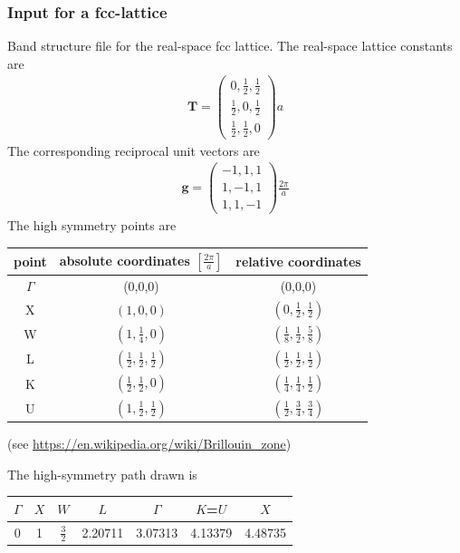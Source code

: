 \documentclass[final,12pt,makeidx,DIV=calc]{article}
\newcommand{\mat}[1]{\mathbf{#1}}
\begin{document}
{{{{{{\subsubsection{Input for a fcc-lattice}
Band structure file for the real-space fcc lattice. The real-space
lattice constants are
\begin{eqnarray}
\mat{T}=\left(\begin{array}{ccc}
0,\frac{1}{2},\frac{1}{2}\\
\frac{1}{2},0,\frac{1}{2}\\
\frac{1}{2},\frac{1}{2},0\end{array}
\right)a
\end{eqnarray}
The corresponding reciprocal unit vectors are
\begin{eqnarray}
\mat{g}=\left(\begin{array}{ccc}
-1,1,1\\
1,-1,1\\
1,1,-1
\end{array}\right)\frac{2\pi}{a}
\end{eqnarray}
The high symmetry points are 
\begin{center}
\begin{tabular}{|c|c|c|}
\hline
point & absolute coordinates $\left[\frac{2\pi}{a}\right]$
      & relative coordinates\\
\hline
$\Gamma$ & (0,0,0) & (0,0,0)\\
X        & $(1,0,0)$ &$(0,\frac{1}{2},\frac{1}{2})$\\
W        & $(1,\frac{1}{4},0)$ &$(\frac{1}{8},\frac{1}{2},\frac{5}{8})$\\
L        & $(\frac{1}{2},\frac{1}{2},\frac{1}{2})$ 
              & $(\frac{1}{2},\frac{1}{2},\frac{1}{2})$\\
K        & $(\frac{1}{2},\frac{1}{2},0)$ 
              & $(\frac{1}{4},\frac{1}{4},\frac{1}{2})$\\
U        & $(1,\frac{1}{2},\frac{1}{2})$ 
              & $(\frac{1}{2},\frac{3}{4},\frac{3}{4})$\\
\hline
\end{tabular}
\end{center}
(see \url{https://en.wikipedia.org/wiki/Brillouin_zone})

The high-symmetry path drawn is
\begin{center}
\begin{tabular}{|c|c|c|c|c|c|c|}
\hline
$\Gamma$ & $X$ & $W$           & $L$     & $\Gamma$ & $K$=$U$ &  $X$    \\
\hline
0        & 1   & $\frac{3}{2}$ & 2.20711 & 3.07313  & 4.13379 & 4.48735 \\
\hline
\end{tabular}
\end{center}

}}}}}}
\end{document}

